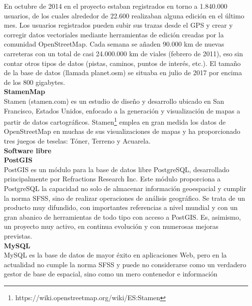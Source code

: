 \documentclass[12pt]{report}
\begin{document}
{{{{{{{{{{{{{{{		En octubre de 2014 en el proyecto estaban registrados en torno a 1.840.000 usuarios, de los cuales alrededor de 22.600 realizaban alguna edición en el último mes.  Los usuarios registrados pueden subir sus trazas desde el GPS y crear y  	corregir datos vectoriales mediante herramientas de edición creadas por la comunidad OpenStreetMap.  Cada semana se añaden 90.000 km de nuevas carreteras con un total de casi 24.000.000 km de viales (febrero de 2011), eso sin contar otros tipos de datos (pistas, caminos, puntos de interés, etc.). El tamaño de la base de datos (llamada planet.osm) se situaba en julio de 2017 por encima de los 800 gigabytes.\\
		
			
				{\bf{StamenMap}}\\
        	Stamen (stamen.com) es un estudio de diseño y desarrollo ubicado en San Francisco, Estados Unidos, enfocado a la generación y visualización de mapas a partir de datos cartográficos. Stamen\footnote{https://wiki.openstreetmap.org/wiki/ES:Stamen}  emplea en gran medida los datos de OpenStreetMap en muchas de sus visualizaciones de mapas y ha proporcionado tres juegos de teselas: Tóner, Terreno y Acuarela.\\
				
				
				
				
				
				{\bf{ Software libre}}\\
				
				
				{\bf{ PostGIS}}\\
				PostGIS es un módulo para la base de datos libre PostgreSQL, desarrollado principalmente por Refractions Research Inc. Este módulo proporciona a PostgreSQL la capacidad no solo de almacenar información geoespacial y cumplir la norma SFSS, sino de realizar operaciones de análisis geográfico. Se trata de un producto muy difundido, con importantes referencias a nivel mundial y con un gran abanico de herramientas de todo tipo con acceso a PostGIS. Es, asimismo, un proyecto muy activo, en continua evolución y con numerosas mejoras previstas.\\
				
				{\bf{ MySQL}}\\
				MySQL  es la base de datos de mayor éxito en aplicaciones Web, pero en la actualidad no cumple la norma SFSS y puede no considerarse como un verdadero gestor de base de espacial, sino como un mero contenedor e información \\
				
}}}}}}}}}}}}}}}
\end{document}
